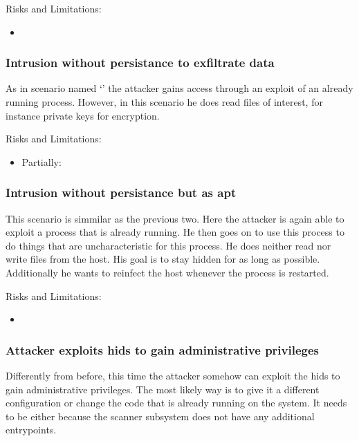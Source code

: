 \documentclass[
	a4paper,					%
	10pt,							%
	twoside,					%
	openright,				%
	notitlepage,			%
	parskip=half,			%
]{scrreprt}					%
\begin{document}
Risks and Limitations:
\begin{itemize}
	\item {}
\end{itemize}

\subsubsection{Intrusion without persistance to exfiltrate data}
\label{sec:attack:nopersistanceexfiltration}

As in scenario named `' the attacker gains access through an exploit of an already running process. However, in this scenario he does read files of interest, for instance private keys for encryption. 

Risks and Limitations:
\begin{itemize}
	\item Partially: 
\end{itemize}

\subsubsection{Intrusion without persistance but as apt}
\label{sec:attack:nopersistanceapt}

This scenario is simmilar as the previous two. Here the attacker is again able to exploit a process that is already running. He then goes on to use this process to do things that are uncharacteristic for this process. He does neither read nor write files from the host. His goal is to stay hidden for as long as possible. Additionally he wants to reinfect the host whenever the process is restarted.

Risks and Limitations:
\begin{itemize}
	\item {}
\end{itemize}

\subsubsection{Attacker exploits \gls{hids} to gain administrative privileges}
\label{sec:attack:exploitforroot}

Differently from before, this time the attacker somehow can exploit the \gls{hids} to gain administrative privileges. The most likely way is to give it a different configuration or change the code that is already running on the system. It needs to be either because the scanner subsystem does not have any additional entrypoints.
\end{document}
